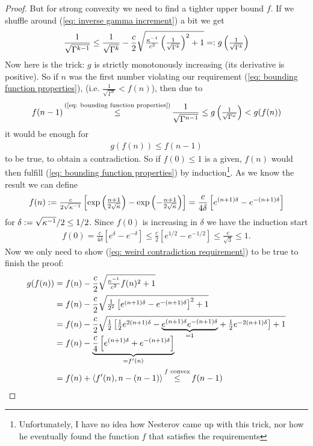 \begin{proof}
	But for strong convexity we need to find a tighter upper bound \(f\). 
	If we shuffle around (\ref{eq: inverse gamma increment}) a bit we get
	\begin{align*}
		\frac{1}{\sqrt{\Gamma^{k-1}}}
		\le \frac{1}{\sqrt{\Gamma^k}}
		- \frac{c}{2}\sqrt{\tfrac{\kappa^{-1}}{c^2}\left(\tfrac{1}{\sqrt{\Gamma^k}}\right)^2+1}
		=: g\left(\tfrac1{\sqrt{\Gamma^k}}\right)
	\end{align*}
	Now here is the trick: \(g\) is strictly monotonously increasing (its
	derivative is positive). So if \(n\) was the first number violating
	our requirement (\ref{eq: bounding function properties}), (i.e.
	\(\tfrac{1}{\sqrt{\Gamma^n}}< f(n)\)), then due to
	\begin{align*}
		f(n-1)
		\xle{\text{(\ref{eq: bounding function properties})}} \frac{1}{\sqrt{\Gamma^{n-1}}}
		\le g\left(\tfrac1{\sqrt{\Gamma^n}}\right) 
		< g(f(n))
	\end{align*}
	it would be enough for
	\begin{align}\label{eq: weird contradiction requirement}
		g(f(n))\le f(n-1)
	\end{align}
	to be true, to obtain a
	contradiction. So if \(f(0)\le 1\) is a given, \(f(n)\) would then fulfill
	(\ref{eq: bounding function properties}) by induction\footnote{Unfortunately,
	I have no idea how Nesterov came up with this trick, nor how he eventually
	found the function \(f\) that satisfies the requirements}. As we know the
	result we can define
	\begin{align*}
		f(n)
		:=\tfrac{c}{2\sqrt{\kappa^{-1}}}\left[
			\exp\left(\tfrac{n+1}{2\sqrt{\kappa}}\right)
			-\exp\left(-\tfrac{n+1}{2\sqrt{\kappa}}\right)
		\right]
		=\frac{c}{4\delta}\left[
			e^{(n+1)\delta}- e^{-(n+1)\delta}
		\right]
	\end{align*}
	for \(\delta:=\sqrt{\kappa^{-1}}/2\le 1/2\). Since \(f(0)\) is increasing in \(\delta\)
	we have the induction start 
	\begin{align*}
		f(0)=\tfrac{c}{4\delta}\left[e^\delta-e^{-\delta}\right]
		\le \tfrac{c}2\left[e^{1/2}-e^{-1/2}\right]
		\le \tfrac{c}{\sqrt{3}} \le 1.
	\end{align*}
	Now we only need to show (\ref{eq: weird contradiction requirement}) to be
	true to finish the proof:
	\begin{align*}
		g(f(n))
		&= f(n) - \frac{c}{2}\sqrt{\tfrac{\condition^{-1}}{c^2}f(n)^2 + 1}\\
		&= f(n) - \frac{c}{2}\sqrt{
			\tfrac{1}{2^2}\left[e^{(n+1)\delta}- e^{-(n+1)\delta}\right]^2
			+ 1
		} \\
		&= f(n) - \frac{c}{2}\sqrt{
			\tfrac{1}{2}\left[
				\tfrac12 e^{2(n+1)\delta}
				-\smash{\underbrace{e^{(n+1)\delta}e^{-(n+1)\delta}}_{=1}}
				+\tfrac12e^{-2(n+1)\delta}
			\right]
			+ 1
		}\\
		&= f(n) - \underbrace{\frac{c}{4}\left[e^{(n+1)\delta}+ e^{-(n+1)\delta}\right]}_{=f'(n)}\\
		&= f(n) + \langle f'(n), n - (n-1) \rangle \xle{f\text{ convex}} f(n-1)
		\qedhere
	\end{align*}
\end{proof}
